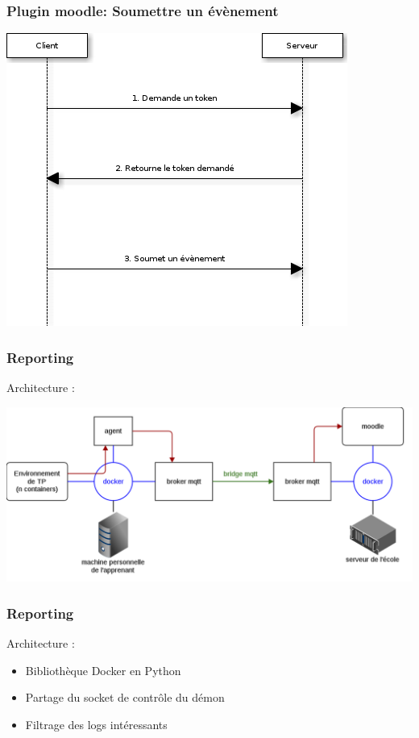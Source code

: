 \documentclass[10pt, compress]{beamer}
\begin{document}
\begin{frame}[fragile]
  \frametitle{Plugin moodle: Soumettre un évènement}
  \begin{center}
    \includegraphics[scale = 0.5]{../french/mem-seq-submit-event.png}
  \end{center}
\end{frame}

\begin{frame}[fragile]
  \frametitle{Reporting}
  Architecture :
   \begin{center}
  \includegraphics[scale = 0.3]{reporting.png}
   \end{center}
\end{frame}

\begin{frame}[fragile]
  \frametitle{Reporting}
  Architecture :
   \begin{itemize}[<+- | alert@+>]
      \item Bibliothèque Docker en Python
      \item Partage du socket de contrôle du démon
      \item Filtrage des logs intéressants
    \end{itemize}
\end{frame}
\end{document}
